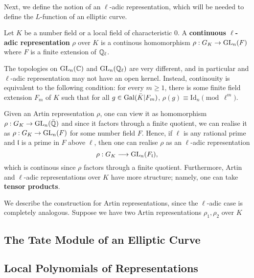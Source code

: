 Next, we define the notion of an $\ell$-adic representation, which will be needed to define the $L$-function of an elliptic curve.

\begin{defn}
    Let $K$ be a number field or a local field of characteristic $0$. A \textbf{continuous $\ell$-adic representation} $\rho$ over $K$ is a continous homomorphism $\rho:G_K\to\mathrm{GL}_n(F)$ where $F$ is a finite extension of $\mathbb{Q}_\ell$.
\end{defn}

\begin{rem}
    The topologies on $\mathrm{GL}_n(\mathbb{C})$ and $\mathrm{GL}_n(\mathbb{Q}_\ell)$ are very different, and in particular and $\ell$-adic representation may not have an open kernel. Instead, continouity is equivalent to the following condition: for every $m\geq1$, there is some finite field extension $F_m$ of $K$ such that for all $g\in\mathrm{Gal}(\bar{K}|F_m)$, $\rho(g)\equiv \mathrm{Id}_n\pmod{\ell^m}$.
\end{rem}

Given an Artin representation $\rho$, one can view it as homomorphism $\rho:G_K\to\mathrm{GL}_n(\bar{\mathbb{Q}})$ and since it factors through a finite quotient, we can realise it as $\rho:G_K\to\mathrm{GL}_n(F)$ for some number field $F$. Hence, if $\ell$ is any rational prime and $\mathfrak{l}$ is a prime in $F$ above $\ell$, then one can realise $\rho$ as an $\ell$-adic representation $$\rho:G_K\longrightarrow\mathrm{GL}_n(F_\mathfrak{l}),$$
which is continous since $\rho$ factors through a finite quotient. Furthermore, Artin and $\ell$-adic representations over $K$ have more structure; namely, one can take \textbf{tensor products}.

We describe the construction for Artin representations, since the $\ell$-adic case is completely analogous. Suppose we have two Artin representations $\rho_1,\rho_2$ over $K$

\subsection{The Tate Module of an Elliptic Curve}

\subsection{Local Polynomials of Representations}


